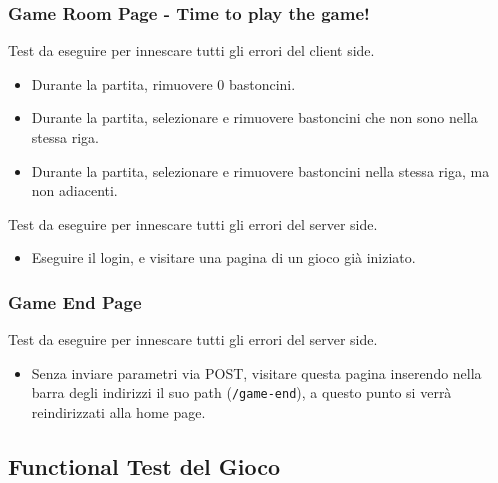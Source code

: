 \subsubsection{Game Room Page - Time to play the game!}

Test da eseguire per innescare tutti gli errori del client side.
\begin{itemize}
\item
	Durante la partita, rimuovere 0 bastoncini.
\item
	Durante la partita, selezionare e rimuovere bastoncini che non sono nella stessa riga.
\item
	Durante la partita, selezionare e rimuovere bastoncini nella stessa riga, ma non adiacenti.
\end{itemize}

\removeHorizontalSpaceBig Test da eseguire per innescare tutti gli errori del server side.
\begin{itemize}
\item
	Eseguire il login, e visitare una pagina di un gioco già iniziato.
\end{itemize}

\subsubsection{Game End Page}

Test da eseguire per innescare tutti gli errori del server side.
\begin{itemize}
\item
	Senza inviare parametri via POST, visitare questa pagina inserendo nella barra degli indirizzi il suo path (\texttt{/game-end}), a questo punto si verrà reindirizzati alla home page.
\end{itemize}

\newpage

\subsection{Functional Test del Gioco}

